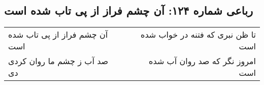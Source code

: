 \begin{center}
\section*{رباعی شماره ۱۲۴: آن چشم فراز از پی تاب شده است}
\label{sec:0124}
\begin{longtable}{l p{0.5cm} r}
آن چشم فراز از پی تاب شده است
&&
تا ظن نبری که فتنه در خواب شده است
\\
صد آب ز چشم ما روان کردی دی
&&
امروز نگر که صد روان آب شده است
\\
\end{longtable}
\end{center}
